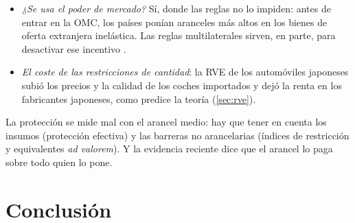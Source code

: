 \documentclass[11pt]{article}
\begin{document}
\begin{itemize}
\begin{itemize}
  \item Es la predicción del país pequeño, no la del grande: la mejora de la RRI que promete el arancel óptimo no apareció en esos bienes, como si la oferta extranjera fuese muy elástica (\ref{sec:general}). La historia de esa guerra comercial, hasta 2026, está en el anexo~\ref{anexo:china}.
  \end{itemize}
\item \emph{¿Se usa el poder de mercado?} Sí, donde las reglas no lo impiden: antes de entrar en la OMC, los países ponían aranceles más altos en los bienes de oferta extranjera inelástica\nocite{BrodaLimaoWeinstein2008Optimal}. Las reglas multilaterales sirven, en parte, para desactivar ese incentivo .
\item \emph{El coste de las restricciones de cantidad}: la RVE de los automóviles japoneses subió los precios y la calidad de los coches importados y dejó la renta en los fabricantes japoneses\nocite{Feenstra1988Quality}, como predice la teoría (\ref{sec:rve}).
\end{itemize}

\begin{ideaclave}
La protección se mide mal con el arancel medio: hay que tener en cuenta los insumos (protección efectiva) y las barreras no arancelarias (índices de restricción y equivalentes \emph{ad valorem}). Y la evidencia reciente dice que el arancel lo paga sobre todo quien lo pone.
\end{ideaclave}

\section*{Conclusión}
\end{document}
